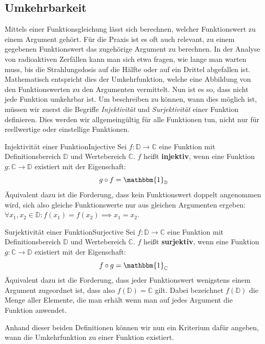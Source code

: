 \subsection{Umkehrbarkeit}

Mittels einer Funktionsgleichung lässt sich berechnen, welcher Funktionswert zu einem Argument gehört. Für die Praxis ist es oft auch relevant, zu einem gegebenen Funktionswert das zugehörige Argument zu berechnen. In der Analyse von radioaktiven Zerfällen kann man sich etwa fragen, wie lange man warten muss, bis die Strahlungsdosis auf die Hälfte oder auf ein Drittel abgefallen ist. Mathematisch entspricht dies der Umkehrfunktion, welche eine Abbildung von den Funktionswerten zu den Argumenten vermittelt. Nun ist es so, dass nicht jede Funktion umkehrbar ist. Um beschreiben zu können, wann dies möglich ist, müssen wir zuerst die Begriffe \emph{Injektivität} und \emph{Surjektivität} einer Funktion definieren. Dies werden wir allgemeingültig für alle Funktionen tun, nicht nur für reellwertige oder einstellige Funktionen.

\begin{definition}{Injektivität einer Funktion}{Injective}
    Sei $f: \mathbb{D} \to \mathbb{C}$ eine Funktion mit Definitionsbereich $\mathbb{D}$ und Wertebereich $\mathbb{C}$. $f$ heißt \textbf{injektiv}, wenn eine Funktion $g: \mathbb{C} \to \mathbb{D}$ existiert mit der Eigenschaft:
    $$
    g \circ f = \mathbbm{1}_\mathbb{D}
    $$
    Äquivalent dazu ist die Forderung, dass kein Funktionswert doppelt angenommen wird, sich also gleiche Funktionswerte nur aus gleichen Argumenten ergeben: $\forall x_1,x_2\in\mathbb{D}: f(x_1)=f(x_2) \implies x_1=x_2$.
\end{definition}

\begin{definition}{Surjektivität einer Funktion}{Surjective}
    Sei $f: \mathbb{D} \to \mathbb{C}$ eine Funktion mit Definitionsbereich $\mathbb{D}$ und Wertebereich $\mathbb{C}$. $f$ heißt \textbf{surjektiv}, wenn eine Funktion $g: \mathbb{C} \to \mathbb{D}$ existiert mit der Eigenschaft:
    $$
    f \circ g = \mathbbm{1}_\mathbb{C}
    $$
    Äquivalent dazu ist die Forderung, dass jeder Funktionswert wenigstens einem Argument zugeordnet ist, dass also $f(\mathbb{D}) = \mathbb{C}$ gilt. Dabei bezeichnet $f(\mathbb{D})$ die Menge aller Elemente, die man erhält wenn man auf jedes Argument die Funktion anwendet.
\end{definition}

Anhand dieser beiden Definitionen können wir nun ein Kriterium dafür angeben, wann die Umkehrfunktion zu einer Funktion existiert.

